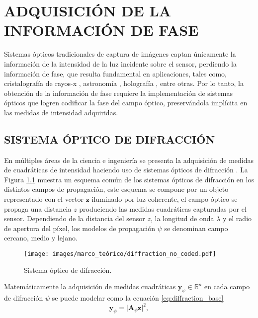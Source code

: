 \chapter{ADQUISICIÓN DE LA INFORMACIÓN DE FASE}

Sistemas ópticos tradicionales de captura de imágenes captan únicamente la información de la intensidad de la luz incidente sobre el sensor, perdiendo la información de fase, que resulta fundamental en aplicaciones, tales como, cristalografía de rayos-x , astronomía , holografía , entre otras. Por lo tanto, la obtención de la información de fase  requiere la implementación  de sistemas ópticos que logren codificar la fase del campo óptico, preservándola implícita en las medidas de intensidad adquiridas. 
    
\section{SISTEMA ÓPTICO DE DIFRACCIÓN}
En múltiples áreas de la ciencia e ingeniería se presenta la adquisición de medidas de cuadráticas de intensidad haciendo uso de sistemas ópticos de difracción . La Figura \ref{fig:difraction_systems} muestra un esquema común de los sistemas ópticos de difracción en los distintos campos de propagación, este esquema se compone por un objeto representado con el vector $\mathbf{z}$ iluminado por luz coherente, el campo óptico se propaga una distancia $z$ produciendo las medidas cuadráticas capturadas por el sensor. Dependiendo de la distancia del sensor $z$, la longitud de onda $\lambda$ y el radio de apertura del píxel, los modelos de propagación $\psi$ se denominan campo cercano, medio y lejano.

\begin{figure}[!h]
    \centering
    \texttt{[image: images/marco\_teórico/diffraction\_no\_coded.pdf]}
    \caption{\hspace{2mm}Sistema óptico de difracción.}
    \label{fig:difraction_systems}
\end{figure}

Matemáticamente la adquisición de medidas cuadráticas $\mathbf{y}_{\psi}\in\mathbb{R}^n$ en cada campo de difracción $\psi$ se puede modelar como la ecuación \eqref{eq:diffraction_base}
\begin{equation}
    \mathbf{y}_{\psi}= \vert \mathbf{A}_\psi \mathbf{z} \vert^2,
    \label{eq:diffraction_base}
\end{equation}

